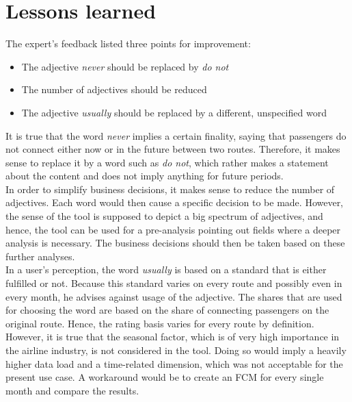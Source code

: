 \documentclass[conference]{IEEEtran}
\begin{document}
\section{Lessons learned}
\label{sec:lessons}
The expert's feedback listed three points for improvement:
\begin{itemize}
\item The adjective \emph{never} should be replaced by \emph{do not}
\item The number of adjectives should be reduced
\item The adjective \emph{usually} should be replaced by a different, unspecified word
\end{itemize}
It is true that the word \emph{never} implies a certain finality, saying that passengers do not connect either now or in the future between two routes. Therefore, it makes sense to replace it by a word such as \emph{do not}, which rather makes a statement about the content and does not imply anything for future periods.\\
In order to simplify business decisions, it makes sense to reduce the number of adjectives. Each word would then cause a specific decision to be made. However, the sense of the tool is supposed to depict a big spectrum of adjectives, and hence, the tool can be used for a pre-analysis pointing out fields where a deeper analysis is necessary. The business decisions should then be taken based on these further analyses.\\
In a user's perception, the word \emph{usually} is based on a standard that is either fulfilled or not. Because this standard varies on every route and possibly even in every month, he advises against usage of the adjective. The shares that are used for choosing the word are based on the share of connecting passengers on the original route. Hence, the rating basis varies for every route by definition. However, it is true that the seasonal factor, which is of very high importance in the airline industry, is not considered in the tool. Doing so would imply a heavily higher data load and a time-related dimension, which was not acceptable for the present use case. A workaround would be to create an FCM for every single month and compare the results.
\end{document}
